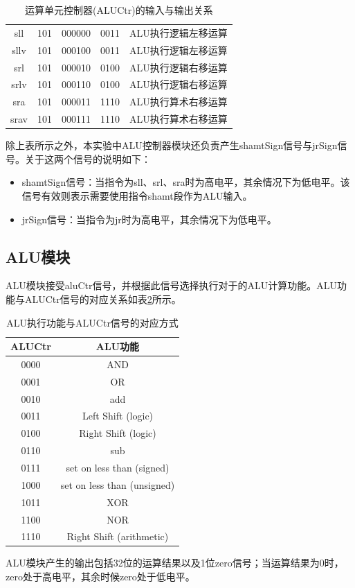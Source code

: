 \documentclass[UTF8]{ctexart}
\begin{document}
\begin{table}[htbp]
\begin{tabular}{|c|c|c|c|c|}
    sll              & 101   & 000000 & 0011   & ALU执行逻辑左移运算   \\
    sllv             & 101   & 000100 & 0011   & ALU执行逻辑左移运算   \\
    srl              & 101   & 000010 & 0100   & ALU执行逻辑右移运算   \\
    srlv             & 101   & 000110 & 0100   & ALU执行逻辑右移运算   \\
    sra              & 101   & 000011 & 1110   & ALU执行算术右移运算   \\
    srav             & 101   & 000111 & 1110   & ALU执行算术右移运算   \\ 
    \hline
    \end{tabular}
    \caption{运算单元控制器(ALUCtr)的输入与输出关系}
    \label{tab:aluctr-in-out}
    \end{table}
    除上表所示之外，本实验中ALU控制器模块还负责产生shamtSign信号与jrSign信号。关于这两个信号的说明如下：
    \begin{itemize}
        \item shamtSign信号：当指令为sll、srl、sra时为高电平，其余情况下为低电平。该信号有效则表示需要使用指令shamt段作为ALU输入。
        \item jrSign信号：当指令为jr时为高电平，其余情况下为低电平。
    \end{itemize}

\subsection{ALU模块}
    ALU模块接受aluCtr信号，并根据此信号选择执行对于的ALU计算功能。ALU功能与ALUCtr信号的对应关系如表\ref{tab:aluctr-sig-name}所示。
    \begin{table}[htbp]
    \centering
    \begin{tabular}{|c|c|}
        \hline
        ALUCtr & ALU功能 \\
        \hline
        0000 & AND \\
        0001 & OR \\
        0010 & add \\
        0011 & Left Shift (logic) \\
        0100 & Right Shift (logic) \\
        0110 & sub \\
        0111 & set on less than (signed) \\
        1000 & set on less than (unsigned) \\
        1011 & XOR \\
        1100 & NOR \\
        1110 & Right Shift (arithmetic) \\
        \hline
    \end{tabular}
    \caption{ALU执行功能与ALUCtr信号的对应方式}
    \label{tab:aluctr-sig-name}
    \end{table}\par
    ALU模块产生的输出包括32位的运算结果以及1位zero信号；当运算结果为0时，zero处于高电平，其余时候zero处于低电平。
\end{document}
